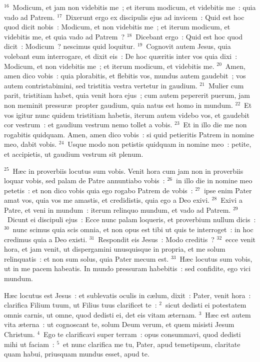 ${}^{16}$~Modicum, et jam non videbitis me~; et iterum modicum, et videbitis me~: quia vado ad Patrem.
${}^{17}$~Dixerunt ergo ex discipulis ejus ad invicem~: Quid est hoc quod dicit nobis~: Modicum, et non videbitis me~; et iterum modicum, et videbitis me, et quia vado ad Patrem~?
${}^{18}$~Dicebant ergo~: Quid est hoc quod dicit~: Modicum~? nescimus quid loquitur.
${}^{19}$~Cognovit autem Jesus, quia volebant eum interrogare, et dixit eis~: De hoc qu\ae ritis inter vos quia dixi~: Modicum, et non videbitis me~; et iterum modicum, et videbitis me.
${}^{20}$~Amen, amen dico vobis~: quia plorabitis, et flebitis vos, mundus autem gaudebit~; vos autem contristabimini, sed tristitia vestra vertetur in gaudium.
${}^{21}$~Mulier cum parit, tristitiam habet, quia venit hora ejus~; cum autem pepererit puerum, jam non meminit pressur\ae\ propter gaudium, quia natus est homo in mundum.
${}^{22}$~Et vos igitur nunc quidem tristitiam habetis, iterum autem videbo vos, et gaudebit cor vestrum~: et gaudium vestrum nemo tollet a vobis.
${}^{23}$~Et in illo die me non rogabitis quidquam. Amen, amen dico vobis~: si quid petieritis Patrem in nomine meo, dabit vobis.
${}^{24}$~Usque modo non petistis quidquam in nomine meo~: petite, et accipietis, ut gaudium vestrum sit plenum.


${}^{25}$~H\ae c in proverbiis locutus sum vobis. Venit hora cum jam non in proverbiis loquar vobis, sed palam de Patre annuntiabo vobis~:
${}^{26}$~in illo die in nomine meo petetis~: et non dico vobis quia ego rogabo Patrem de vobis~:
${}^{27}$~ipse enim Pater amat vos, quia vos me amastis, et credidistis, quia ego a Deo exivi.
${}^{28}$~Exivi a Patre, et veni in mundum~: iterum relinquo mundum, et vado ad Patrem.
${}^{29}$~Dicunt ei discipuli ejus~: Ecce nunc palam loqueris, et proverbium nullum dicis~:
${}^{30}$~nunc scimus quia scis omnia, et non opus est tibi ut quis te interroget~: in hoc credimus quia a Deo existi.
${}^{31}$~Respondit eis Jesus~: Modo creditis~?
${}^{32}$~ecce venit hora, et jam venit, ut dispergamini unusquisque in propria, et me solum relinquatis~: et non sum solus, quia Pater mecum est.
${}^{33}$~H\ae c locutus sum vobis, ut in me pacem habeatis. In mundo pressuram habebitis~: sed confidite, ego vici mundum.

\lettrine[lines=10,image=true,loversize=0.05,lraise=-0.03]{H}{}\ae c locutus est Jesus~: et sublevatis oculis in c\ae lum, dixit~: Pater, venit hora~: clarifica Filium tuum, ut Filius tuus clarificet te~:
${}^{2}$~sicut dedisti ei potestatem omnis carnis, ut omne, quod dedisti ei, det eis vitam \ae ternam.
${}^{3}$~H\ae c est autem vita \ae terna~: ut cognoscant te, solum Deum verum, et quem misisti Jesum Christum.
${}^{4}$~Ego te clarificavi super terram~: opus consummavi, quod dedisti mihi ut faciam~:
${}^{5}$~et nunc clarifica me tu, Pater, apud temetipsum, claritate quam habui, priusquam mundus esset, apud te.


